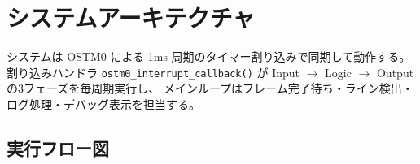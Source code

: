 \documentclass[a4paper,11pt,dvipdfmx]{jsarticle}
\begin{document}
\section{システムアーキテクチャ}\label{sec:architecture}

システムは OSTM0 による 1ms 周期のタイマー割り込みで同期して動作する。
割り込みハンドラ \texttt{ostm0\_interrupt\_callback()} が
Input $\rightarrow$ Logic $\rightarrow$ Output の3フェーズを毎周期実行し、
メインループはフレーム完了待ち・ライン検出・ログ処理・デバッグ表示を担当する。

\subsection{実行フロー図}\label{sec:flow}
\end{document}
